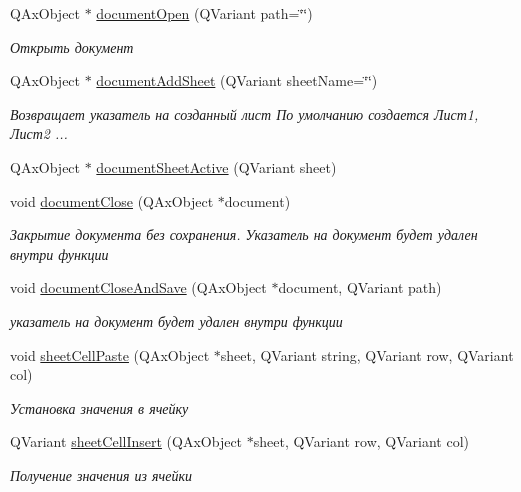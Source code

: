 \begin{DoxyCompactItemize}
\item 
Q\+Ax\+Object $\ast$ \hyperlink{class_active_excel_a64a459d7894744a4e879670db82692f7}{document\+Open} (Q\+Variant path=\char`\"{}\char`\"{})
\begin{DoxyCompactList}\small\item\em Открыть документ \end{DoxyCompactList}\item 
Q\+Ax\+Object $\ast$ \hyperlink{class_active_excel_ab59ba747de1ca7170d2901ac186f0b4d}{document\+Add\+Sheet} (Q\+Variant sheet\+Name=\char`\"{}\char`\"{})
\begin{DoxyCompactList}\small\item\em Возвращает указатель на созданный лист По умолчанию создается Лист1, Лист2 ... \end{DoxyCompactList}\item 
Q\+Ax\+Object $\ast$ \hyperlink{class_active_excel_a259dc8f89d7d93726c2fd9ef86a53044}{document\+Sheet\+Active} (Q\+Variant sheet)
\item 
void \hyperlink{class_active_excel_a7be6d6cfc05409fd23d9ae0dff95353b}{document\+Close} (Q\+Ax\+Object $\ast$document)
\begin{DoxyCompactList}\small\item\em Закрытие документа без сохранения. Указатель на документ будет удален внутри функции \end{DoxyCompactList}\item 
void \hyperlink{class_active_excel_ab3bf3535715a62ca818013cd9d8cd05a}{document\+Close\+And\+Save} (Q\+Ax\+Object $\ast$document, Q\+Variant path)
\begin{DoxyCompactList}\small\item\em указатель на документ будет удален внутри функции \end{DoxyCompactList}\item 
void \hyperlink{class_active_excel_ae6e242799d2be9d766f053ed01286b48}{sheet\+Cell\+Paste} (Q\+Ax\+Object $\ast$sheet, Q\+Variant string, Q\+Variant row, Q\+Variant col)
\begin{DoxyCompactList}\small\item\em Установка значения в ячейку \end{DoxyCompactList}\item 
Q\+Variant \hyperlink{class_active_excel_ad0e7d4faad5ac5b1d476b2112e835636}{sheet\+Cell\+Insert} (Q\+Ax\+Object $\ast$sheet, Q\+Variant row, Q\+Variant col)
\begin{DoxyCompactList}\small\item\em Получение значения из ячейки \end{DoxyCompactList}\item 

\end{DoxyCompactItemize}
